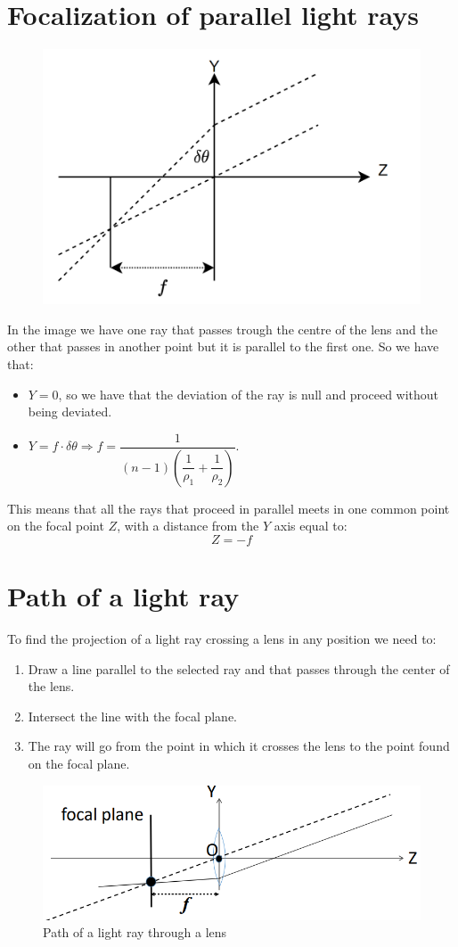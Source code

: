 \documentclass[12pt, a4paper]{report}
\newtheorem[style=M,bodystyle=\normalfont]{theorem}{Theorem}
\newtheorem[style=M,bodystyle=\normalfont]{corollary}{Corollary}
\newtheorem[style=M,bodystyle=\normalfont]{lemma}{Lemma}
\newtheorem[style=M,bodystyle=\normalfont]{definition}{Definition}
\begin{document}
    \section{Focalization of parallel light rays}
    \begin{figure}[H]
        \centering
        \includegraphics[width=0.5\linewidth]{images/focalization.png}
    \end{figure}
    In the image we have one ray that passes trough the centre of the lens and the other that passes in another point but it is parallel to the first one. So we have that: 
    \begin{itemize}
        \item $Y=0$, so we have that the deviation of the ray is null and proceed without being deviated. 
        \item $Y=f \cdot \delta \theta \Rightarrow f=\dfrac{1}{(n-1)\left( \dfrac{1}{\rho_1} + \dfrac{1}{\rho_2}\right)}$. 
    \end{itemize}
    This means that all the rays that proceed in parallel meets in one common point on the focal point $Z$, with a distance from the $Y$ axis equal to: 
    \[Z=-f\]

    \section{Path of a light ray}
    To find the projection of a light ray crossing a lens in any position we need to:
    \begin{enumerate}
        \item Draw a line parallel to the selected ray and that passes through the center of the lens. 
        \item Intersect the line with the focal plane.
        \item The ray will go from the point in which it crosses the lens to the point found on the focal plane. 
    \end{enumerate}
    \begin{figure}[H]
        \centering
        \includegraphics[width=0.5\linewidth]{images/path.png}
        \caption{Path of a light ray through a lens}
    \end{figure}
\end{document}
